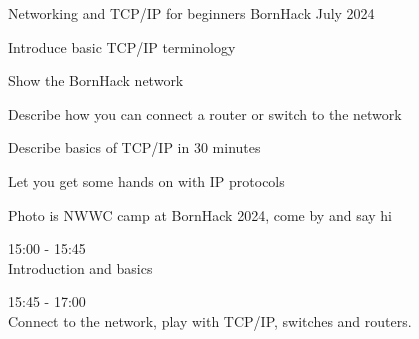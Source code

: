 \documentclass[Screen16to9,17pt]{foils}
\begin{document}






\mytitlepage
{Networking and TCP/IP for beginners}
{BornHack July 2024}


\hlkprofiluk



\begin{list2}
\item Introduce basic TCP/IP terminology
\item Show the BornHack network
\item Describe how you can connect a router or switch to the network
\item Describe basics of TCP/IP in 30 minutes
\item Let you get some hands on with IP protocols
\end{list2}

Photo is NWWC camp at BornHack 2024, come by and say hi



\begin{list2}
\item 15:00 - 15:45\\
Introduction and basics

\item 15:45 - 17:00\\
Connect to the network, play with TCP/IP, switches and routers.
\end{list2}
\end{document}
